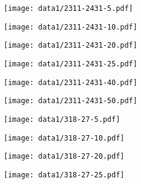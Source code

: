\documentclass{article}
\begin{document}
\begin{figure}[!htbp]
   \centering
   \begin{minipage}[t]{0.329\linewidth}
      \centering
      \texttt{[image: data1/2311-2431-5.pdf]}   
   \end{minipage}
   \begin{minipage}[t]{0.329\linewidth}
      \centering
      \texttt{[image: data1/2311-2431-10.pdf]}   
   \end{minipage}
   \begin{minipage}[t]{0.329\linewidth}
      \centering
      \texttt{[image: data1/2311-2431-20.pdf]}   
   \end{minipage}
   \begin{minipage}[t]{0.329\linewidth}
      \centering
      \texttt{[image: data1/2311-2431-25.pdf]}   
   \end{minipage}
   \begin{minipage}[t]{0.329\linewidth}
      \centering
      \texttt{[image: data1/2311-2431-40.pdf]}   
   \end{minipage}
   \begin{minipage}[t]{0.329\linewidth}
      \centering
      \texttt{[image: data1/2311-2431-50.pdf]}   
   \end{minipage}
   \begin{minipage}[t]{0.329\linewidth}
      \centering
      \texttt{[image: data1/318-27-5.pdf]}   
   \end{minipage}
   \begin{minipage}[t]{0.329\linewidth}
      \centering
      \texttt{[image: data1/318-27-10.pdf]}   
   \end{minipage}
   \begin{minipage}[t]{0.329\linewidth}
      \centering
      \texttt{[image: data1/318-27-20.pdf]}   
   \end{minipage}
   \begin{minipage}[t]{0.329\linewidth}
      \centering
      \texttt{[image: data1/318-27-25.pdf]}   

\end{minipage}
\end{figure}
\end{document}

